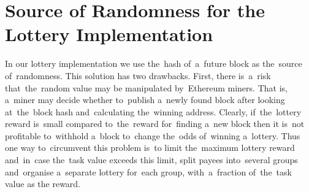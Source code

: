 \documentclass[a4paper]{article}
\begin{document}






\section{Source of Randomness for the Lottery Implementation}
\label{sec:randomness}
    In our lottery implementation we use the~hash of~a~future block as the~source of~randomness. This solution has
    two drawbacks. First, there is~a~risk that~the~random value may be manipulated by~Ethereum miners. That is,
    a~miner may decide whether to~publish a~newly found block after looking at~the~block hash and~calculating
    the~winning address. Clearly, if~the~lottery reward is~small compared to~the~reward for~finding a~new block
    then it is~not profitable to~withhold a~block to~change the~odds of~winning a~lottery. Thus one way to~circumvent
    this problem is~to limit the~maximum lottery reward and~in~case the~task value exceeds this limit, split payees
    into~several groups and~organise a~separate lottery for~each group, with~a~fraction of~the~task value as the
    reward.
\end{document}
